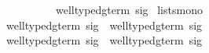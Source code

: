 \begin{isabellebody}
\ \ \ \ \ \ \ \ \ {\isasymin}\ well{\isacharunderscore}typed{\isacharunderscore}gterm{\isacharprime}\ sig{\isachardoublequote}\isanewline
{}\ lists{\isacharunderscore}mono\isanewline
\isanewline
\isanewline
\isamarkupfalse%
\ {\isachardoublequote}well{\isacharunderscore}typed{\isacharunderscore}gterm\ sig\ {\isasymsubseteq}\ well{\isacharunderscore}typed{\isacharunderscore}gterm{\isacharprime}\ sig{\isachardoublequote}\isanewline
\isamarkupfalse%
\isamarkupfalse%
\isamarkupfalse%
\isamarkupfalse%
\isanewline
\isamarkupfalse%
\ {\isachardoublequote}well{\isacharunderscore}typed{\isacharunderscore}gterm{\isacharprime}\ sig\ {\isasymsubseteq}\ well{\isacharunderscore}typed{\isacharunderscore}gterm\ sig{\isachardoublequote}\isanewline
\isamarkupfalse%
\isamarkupfalse%
\isamarkupfalse%
\isamarkupfalse%
\isanewline
\isanewline
\isamarkupfalse%
\isanewline
\isanewline
\isamarkupfalse%
\end{isabellebody}%
